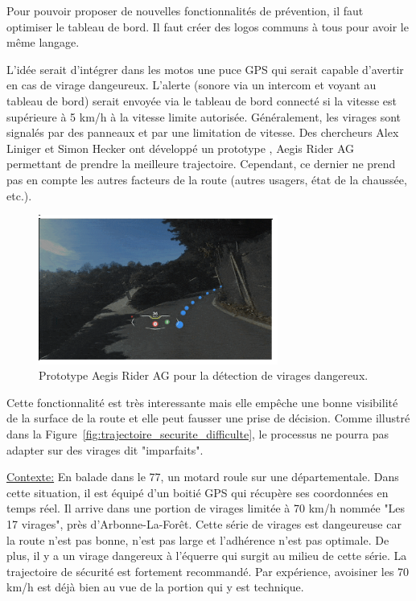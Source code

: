 
Pour pouvoir proposer de nouvelles fonctionnalités de prévention, il faut optimiser le tableau de bord. Il faut créer des logos communs à tous pour avoir le même langage. 

L'idée serait d'intégrer dans les motos une puce GPS qui serait capable d'avertir en cas de virage dangeureux. L'alerte (sonore via un intercom et voyant au tableau de bord) serait envoyée via le tableau de bord connecté si la vitesse est supérieure à 5 km/h à la vitesse limite autorisée. Généralement, les virages sont signalés par des panneaux et par une limitation de vitesse. Des chercheurs Alex Liniger et Simon Hecker ont développé un prototype , Aegis Rider AG\cite{vitesse_virage_mcnews} permettant de prendre la meilleure trajectoire. Cependant, ce dernier ne prend pas en compte les autres facteurs de la route (autres usagers, état de la chaussée, etc.). 

\begin{figure}[h]
    \centering
    \includegraphics[width=0.7\textwidth]{coeur_memoire/images/aegis.png} 
    \caption{Prototype Aegis Rider AG pour la détection de virages dangereux.}
\end{figure}
Cette fonctionnalité est très interessante mais elle empêche une bonne visibilité de la surface de la route et elle peut fausser une prise de décision.
Comme illustré dans la Figure~\ref{fig:trajectoire_securite_difficulte}, le processus ne pourra pas adapter sur des virages dit "imparfaits".










\underline{Contexte:} En balade dans le 77, un motard roule sur une départementale. Dans cette situation, il est équipé d'un boitié GPS qui récupère ses coordonnées en temps réel. Il arrive dans une portion de virages limitée à 70 km/h nommée "Les 17 virages", près d'Arbonne-La-Forêt. Cette série de virages est dangeureuse car la route n'est pas bonne, n'est pas large et l'adhérence n'est pas optimale. De plus, il y a un virage dangereux à l'équerre qui surgit au milieu de cette série. La trajectoire de sécurité est fortement recommandé. Par expérience, avoisiner les 70 km/h est déjà bien au vue de la portion qui y est technique. 

